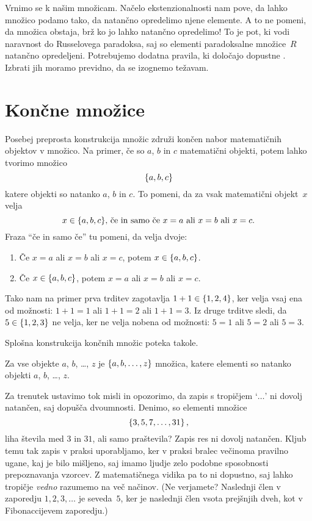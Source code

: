 Vrnimo se k našim množicam. Načelo ekstenzionalnosti nam pove, da lahko množico podamo
tako, da natančno opredelimo njene elemente. A to ne pomeni, da množica obstaja, brž ko jo
lahko natančno opredelimo! To je pot, ki vodi naravnost do Russelovega paradoksa, saj so
elementi paradoksalne množice~$R$ natančno opredeljeni. Potrebujemo dodatna pravila, ki
določajo dopustne . Izbrati jih moramo previdno, da se izognemo
težavam.

\section{Končne množice}
\label{sec:koncne-mnozice}

Posebej preprosta konstrukcija množic združi končen nabor matematičnih objektov v množico.
Na primer, če so $a$, $b$ in $c$ matematični objekti, potem lahko tvorimo množico
%
\begin{equation*}
  \set{a, b, c}
\end{equation*}
%
katere objekti so natanko $a$, $b$ in $c$. To pomeni, da za vsak matematični objekt~$x$
velja
%
\begin{equation*}
  \text{$x \in \set{a, b, c}$, če in samo če $x = a$ ali $x = b$ ali $x = c$.}
\end{equation*}
%
Fraza ``če in samo če'' tu pomeni, da velja dvoje:
%
\begin{enumerate}
\item Če $x = a$ ali $x = b$ ali $x = c$, potem $x \in \set{a, b, c}$.
\item Če $x \in \set{a, b, c}$, potem $x = a$ ali $x = b$ ali $x = c$.
\end{enumerate}
%
Tako nam na primer prva trditev zagotavlja $1+1 \in \set{1, 2, 4}$, ker velja
vsaj ena od možnosti: $1 + 1 = 1$ ali $1 + 1 = 2$ ali $1 + 1 = 3$. Iz druge trditve sledi, da
$5 \in \set{1, 2, 3}$ ne velja, ker ne velja nobena od možnosti: $5 = 1$ ali $5 = 2$ ali
$5 = 3$.

Splošna konstrukcija končnih množic poteka takole.

\begin{pravilo}
  \label{pravilo:koncna-mnozica}
  Za vse objekte $a$, $b$, \dots, $z$ je $\set{a, b, \ldots, z}$ množica, katere elementi
  so natanko objekti $a$, $b$, \dots, $z$.
\end{pravilo}

Za trenutek ustavimo tok misli in opozorimo, da zapis s tropičjem `$\ldots$' ni dovolj
natančen, saj dopušča dvoumnosti. Denimo, so elementi množice
%
\begin{equation*}
  \set{3, 5, 7, \ldots, 31},
\end{equation*}
%
liha števila med $3$ in $31$, ali samo praštevila? Zapis res ni dovolj natančen. Kljub
temu tak zapis v praksi uporabljamo, ker v praksi bralec večinoma pravilno ugane, kaj je
bilo mišljeno, saj imamo ljudje zelo podobne sposobnosti prepoznavanja vzorcev. Z
matematičnega vidika pa to ni dopustno, saj lahko tropičje \emph{vedno} razumemo na več
načinov. (Ne verjamete? Naslednji člen v zaporedju $1, 2, 3, \ldots$ je seveda~$5$, ker je
naslednji člen vsota prejšnjih dveh, kot v Fibonaccijevem zaporedju.)

